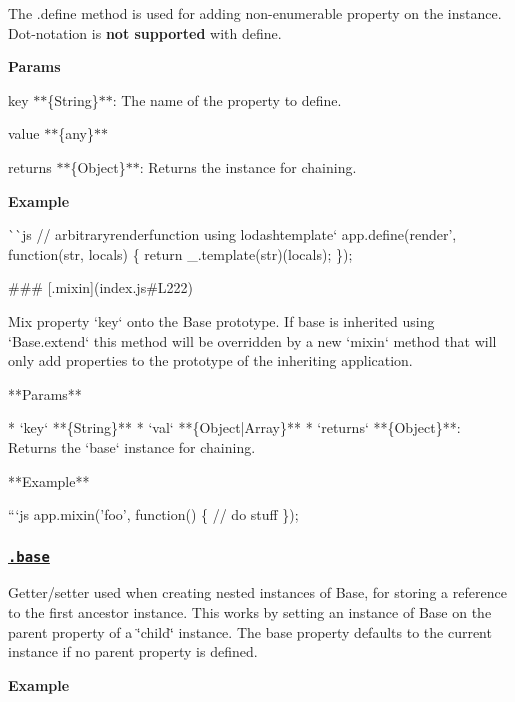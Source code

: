 The {\ttfamily .define} method is used for adding non-\/enumerable property on the instance. Dot-\/notation is {\bfseries not supported} with {\ttfamily define}.

{\bfseries Params}


\begin{DoxyItemize}
\item {\ttfamily key} $\ast$$\ast$\{String\}$\ast$$\ast$\+: The name of the property to define.
\item {\ttfamily value} $\ast$$\ast$\{any\}$\ast$$\ast$
\item {\ttfamily returns} $\ast$$\ast$\{Object\}$\ast$$\ast$\+: Returns the instance for chaining.
\end{DoxyItemize}

{\bfseries Example}

\`{}\`{}{\ttfamily js // arbitrary}render{\ttfamily function using lodash}template` app.\+define(\textquotesingle{}render', function(str, locals) \{ return \+\_\+.\+template(str)(locals); \}); 
\begin{DoxyCode}
### [.mixin](index.js#L222)

Mix property `key` onto the Base prototype. If base is inherited using `Base.extend` this method will be
       overridden by a new `mixin` method that will only add properties to the prototype of the inheriting
       application.

**Params**

* `key` **\{String\}**
* `val` **\{Object|Array\}**
* `returns` **\{Object\}**: Returns the `base` instance for chaining.

**Example**

```js
app.mixin('foo', function() \{
  // do stuff
\});
\end{DoxyCode}


\subsubsection*{\href{index.js#L268}{\tt .base}}

Getter/setter used when creating nested instances of {\ttfamily Base}, for storing a reference to the first ancestor instance. This works by setting an instance of {\ttfamily Base} on the {\ttfamily parent} property of a \char`\"{}child\char`\"{} instance. The {\ttfamily base} property defaults to the current instance if no {\ttfamily parent} property is defined.

{\bfseries Example}


